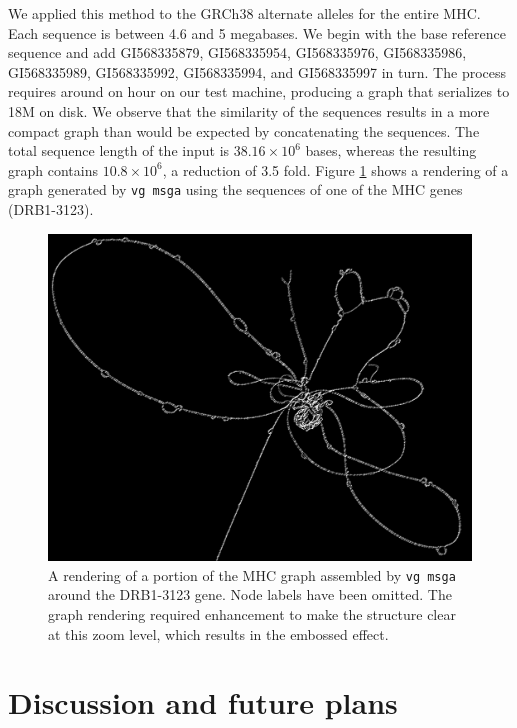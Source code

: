 \documentclass{article}
\begin{document}
We applied this method to the GRCh38 alternate alleles for the entire MHC.
Each sequence is between 4.6 and 5 megabases.
We begin with the base reference sequence and add GI568335879, GI568335954, GI568335976, GI568335986, GI568335989, GI568335992, GI568335994, and GI568335997 in turn.
The process requires around on hour on our test machine, producing a graph that serializes to 18M on disk.
We observe that the similarity of the sequences results in a more compact graph than would be expected by concatenating the sequences.
The total sequence length of the input is $38.16 \times 10^6$ bases, whereas the resulting graph contains $10.8 \times 10^6$, a reduction of 3.5 fold.
Figure \ref{fig:DRB1-3123} shows a rendering of a graph generated by {\tt vg msga} using the sequences of one of the MHC genes (DRB1-3123).


\begin{figure}[t]
\centering
\includegraphics[width=1.0\textwidth]{figures/DRB1-3123}
\caption{\label{fig:DRB1-3123}
  A rendering of a portion of the MHC graph assembled by {\tt vg msga} around the DRB1-3123 gene.
  Node labels have been omitted. The graph rendering required enhancement to make the structure clear at this zoom level, which results in the embossed effect.
}
\end{figure}

\section{Discussion and future plans}
\end{document}
